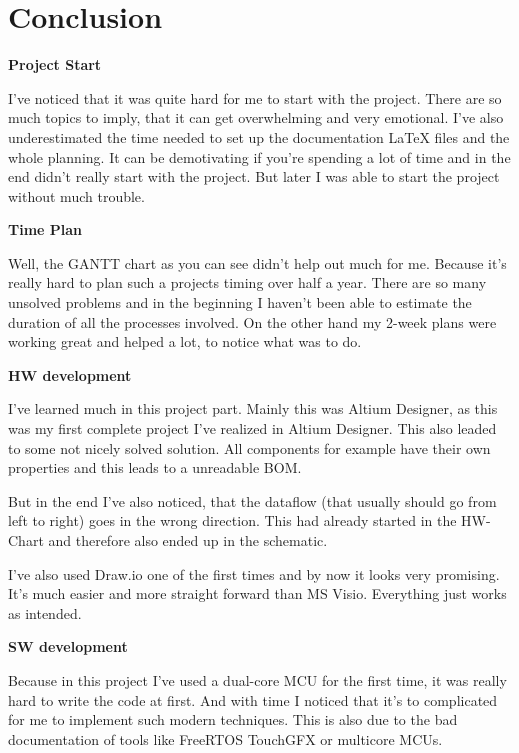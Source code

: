 \chapter{Conclusion}
\label{cha:Conclusion}


\textbf{Project Start}

I've noticed that it was quite hard for me to start with the project. There are so much topics to imply, that it can get overwhelming and very emotional. I've also underestimated the time needed to set up the documentation LaTeX files and the whole planning. It can be demotivating if you're spending a lot of time and in the end didn't really start with the project. But later I was able to start the project without much trouble. 

\vspace{5mm}
\textbf{Time Plan}

Well, the GANTT chart as you can see didn't help out much for me. Because it's really hard to plan such a projects timing over half a year. There are so many unsolved problems and in the beginning I haven't been able to estimate the duration of all the processes involved. On the other hand my 2-week plans were working great and helped a lot, to notice what was to do.

\vspace{5mm}
\textbf{HW development}

I've learned much in this project part. Mainly this was Altium Designer, as this was my first complete project I've realized in Altium Designer. This also leaded to some not nicely solved solution. All components for example have their own properties and this leads to a unreadable BOM.

But in the end I've also noticed, that the dataflow (that usually should go from left to right) goes in the wrong direction. This had already started in the HW-Chart and therefore also ended up in the schematic.

I've also used Draw.io one of the first times and by now it looks very promising. It's much easier and more straight forward than MS Visio. Everything just works as intended.

\vspace{5mm}
\textbf{SW development}

Because in this project I've used a dual-core MCU for the first time, it was really hard to write the code at first. And with time I noticed that it's to complicated for me to implement such modern techniques. This is also due to the bad documentation of tools like FreeRTOS TouchGFX or multicore MCUs.

